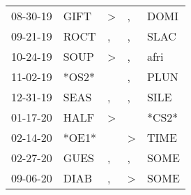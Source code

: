 \begin{supertabular}{lllll}
 08-30-19 &   GIFT &  \textgreater &             , &   DOMI \\
 09-21-19 &   ROCT &             , &             , &   SLAC \\
 10-24-19 &   SOUP &  \textgreater &             , &   afri \\
 11-02-19 &  *OS2* &               &             , &   PLUN \\
 12-31-19 &   SEAS &             , &             , &   SILE \\
 01-17-20 &   HALF &  \textgreater &               &  *CS2* \\
 02-14-20 &  *OE1* &               &  \textgreater &   TIME \\
 02-27-20 &   GUES &             , &             , &   SOME \\
 09-06-20 &   DIAB &             , &  \textgreater &   SOME \\
\end{supertabular}
